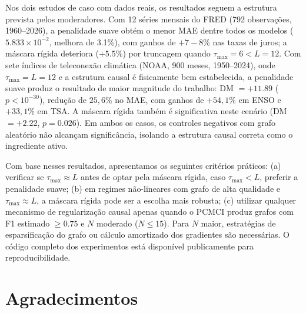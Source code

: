 \documentclass[12pt, a4paper]{article}
\begin{document}
Nos dois estudos de caso com dados reais, os resultados seguem a estrutura prevista pelos moderadores. Com 12 séries mensais do FRED (792 observações, 1960--2026), a penalidade suave obtém o menor MAE dentre todos os modelos ($5.833 \times 10^{-2}$, melhora de 3.1\%), com ganhos de $+7{-}8\%$ nas taxas de juros; a máscara rígida deteriora ($+5.5\%$) por truncagem quando $\tau_{\max} = 6 < L = 12$. Com sete índices de teleconexão climática (NOAA, 900 meses, 1950--2024), onde $\tau_{\max} = L = 12$ e a estrutura causal é fisicamente bem estabelecida, a penalidade suave produz o resultado de maior magnitude do trabalho: DM $= +11.89$ ($p < 10^{-30}$), redução de $25{,}6\%$ no MAE, com ganhos de $+54{,}1\%$ em ENSO e $+33{,}1\%$ em TSA. A máscara rígida também é significativa neste cenário (DM $= +2.22$, $p = 0.026$). Em ambos os casos, os controles negativos com grafo aleatório não alcançam significância, isolando a estrutura causal correta como o ingrediente ativo.

Com base nesses resultados, apresentamos os seguintes critérios práticos: (a) verificar se $\tau_{\max} \approx L$ antes de optar pela máscara rígida, caso $\tau_{\max} < L$, preferir a penalidade suave; (b) em regimes não-lineares com grafo de alta qualidade e $\tau_{\max} \approx L$, a máscara rígida pode ser a escolha mais robusta; (c) utilizar qualquer mecanismo de regularização causal apenas quando o PCMCI produz grafos com F1 estimado $\geq 0.75$ e $N$ moderado ($N \leq 15$). Para $N$ maior, estratégias de esparsificação do grafo ou cálculo amortizado dos gradientes são necessárias. O código completo dos experimentos está disponível publicamente para reproducibilidade.

\section*{Agradecimentos}
\end{document}
